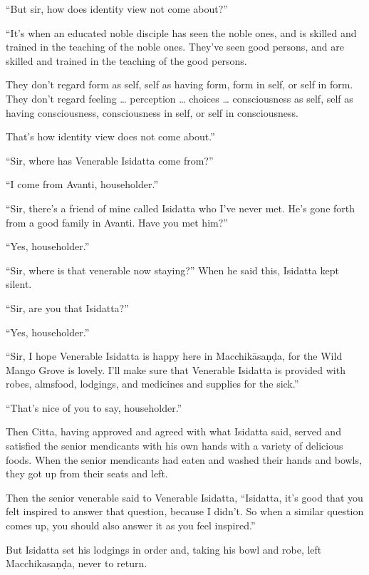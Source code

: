 \documentclass[12pt,openany]{book}%
\begin{document}
“But sir, how does identity view not come about?” 

“It’s when an educated noble disciple has seen the noble ones, and is skilled and trained in the teaching of the noble ones. They’ve seen good persons, and are skilled and trained in the teaching of the good persons. 

They don’t regard form as self, self as having form, form in self, or self in form. They don’t regard feeling … perception … choices … consciousness as self, self as having consciousness, consciousness in self, or self in consciousness. 

That’s how identity view does not come about.” 

“Sir, where has Venerable Isidatta come from?” 

“I come from Avanti, householder.” 

“Sir, there’s a friend of mine called Isidatta who I’ve never met. He’s gone forth from a good family in Avanti. Have you met him?” 

“Yes, householder.” 

“Sir, where is that venerable now staying?” When he said this, Isidatta kept silent. 

“Sir, are you that Isidatta?” 

“Yes, householder.” 

“Sir, I hope Venerable Isidatta is happy here in \textsanskrit{Macchikāsaṇḍa}, for the Wild Mango Grove is lovely. I’ll make sure that Venerable Isidatta is provided with robes, almsfood, lodgings, and medicines and supplies for the sick.” 

“That’s nice of you to say, householder.” 

Then Citta, having approved and agreed with what Isidatta said, served and satisfied the senior mendicants with his own hands with a variety of delicious foods. When the senior mendicants had eaten and washed their hands and bowls, they got up from their seats and left. 

Then the senior venerable said to Venerable Isidatta, “Isidatta, it’s good that you felt inspired to answer that question, because I didn’t. So when a similar question comes up, you should also answer it as you feel inspired.” 

But Isidatta set his lodgings in order and, taking his bowl and robe, left \textsanskrit{Macchikasaṇḍa}, never to return. 
\end{document}
